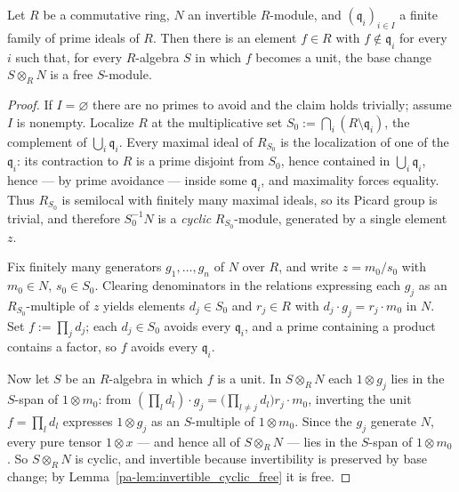 \begin{theorem}
  \label{pa-thm:invertible_avoid_free}
  \leanok

  Let \(R\) be a commutative ring, \(N\) an invertible \(R\)-module, and \((\mathfrak q_i)_{i \in I}\)
  a finite family of prime ideals of \(R\). Then there is an element \(f \in R\) with \(f \notin
  \mathfrak q_i\) for every \(i\) such that, for every \(R\)-algebra \(S\) in which \(f\) becomes a
  unit, the base change \(S \otimes_R N\) is a free \(S\)-module.
\end{theorem}
\begin{proof}
  \leanok
  If \(I = \varnothing\) there are no primes to avoid and the claim holds trivially; assume \(I\) is
  nonempty. Localize \(R\) at the multiplicative set \(S_0 := \bigcap_i (R \setminus \mathfrak q_i)\),
  the complement of \(\bigcup_i \mathfrak q_i\). Every maximal ideal of \(R_{S_0}\) is the
  localization of one of the \(\mathfrak q_i\): its contraction to \(R\) is a prime disjoint from
  \(S_0\), hence contained in \(\bigcup_i \mathfrak q_i\), hence --- by prime avoidance --- inside
  some \(\mathfrak q_i\), and maximality forces equality. Thus \(R_{S_0}\) is semilocal with finitely
  many maximal ideals, so its Picard group is trivial, and therefore \(S_0^{-1}N\) is a \emph{cyclic}
  \(R_{S_0}\)-module, generated by a single element \(z\).

  Fix finitely many generators \(g_1, \dots, g_n\) of \(N\) over \(R\), and write \(z = m_0 / s_0\)
  with \(m_0 \in N\), \(s_0 \in S_0\). Clearing denominators in the relations expressing each \(g_j\)
  as an \(R_{S_0}\)-multiple of \(z\) yields elements \(d_j \in S_0\) and \(r_j \in R\) with
  \(d_j \cdot g_j = r_j \cdot m_0\) in \(N\). Set \(f := \prod_j d_j\); each \(d_j \in S_0\) avoids
  every \(\mathfrak q_i\), and a prime containing a product contains a factor, so \(f\) avoids every
  \(\mathfrak q_i\).

  Now let \(S\) be an \(R\)-algebra in which \(f\) is a unit. In \(S \otimes_R N\) each \(1 \otimes
  g_j\) lies in the \(S\)-span of \(1 \otimes m_0\): from \((\prod_l d_l)\cdot g_j = \bigl(\prod_{l
  \ne j} d_l\bigr) r_j \cdot m_0\), inverting the unit \(f = \prod_l d_l\) expresses \(1 \otimes g_j\)
  as an \(S\)-multiple of \(1 \otimes m_0\). Since the \(g_j\) generate \(N\), every pure tensor
  \(1 \otimes x\) --- and hence all of \(S \otimes_R N\) --- lies in the \(S\)-span of \(1 \otimes
  m_0\). So \(S \otimes_R N\) is cyclic, and invertible because invertibility is preserved by base
  change; by Lemma~\ref{pa-lem:invertible_cyclic_free} it is free.
\end{proof}

